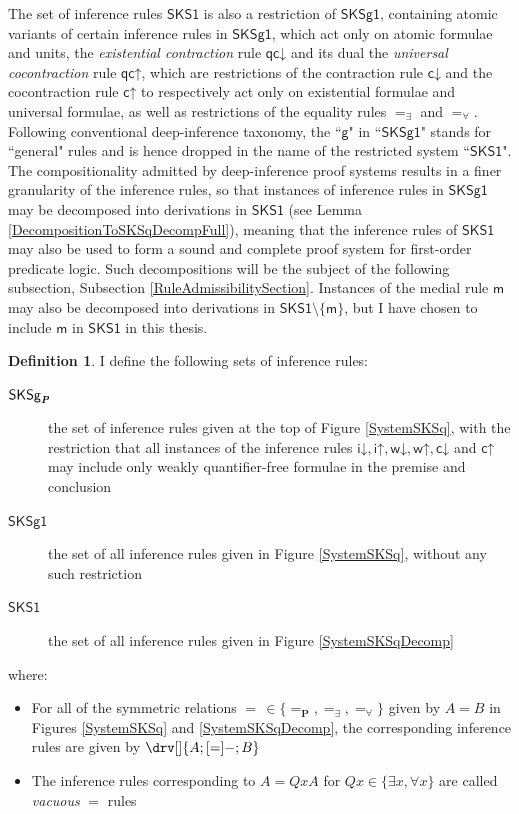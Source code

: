 \documentclass[10pt]{article}
\theoremstyle{definition}\newtheorem{remark}[theorem]{Remark}
\theoremstyle{definition}\newtheorem{example}[theorem]{Example}
\theoremstyle{definition}\newtheorem{definition}[theorem]{Definition}
\newcommand{\SKSProp}{{\mathsf{SKSg}_{\textbf{\textit{P}}}}}
\newcommand{\SKSq}{{\mathsf{SKSg1}}}
\newcommand{\SKSqDecomp}{{\mathsf{SKS1}}}
\newcommand{\iUp}{{\mathsf{i\mathord\uparrow}}}
\newcommand{\iDown}{{\mathsf{i\mathord\downarrow}}}
\newcommand{\cUp}{{\mathsf{c\mathord\uparrow}}}
\newcommand{\cDown}{{\mathsf{c\mathord\downarrow}}}
\newcommand{\wUp}{{\mathsf{w\mathord\uparrow}}}
\newcommand{\wDown}{{\mathsf{w\mathord\downarrow}}}
\newcommand{\medial}{{\mathsf{m}}}
\newcommand{\qcUp}{{\mathsf{qc\mathord\uparrow}}}
\newcommand{\qcDown}{{\mathsf{qc\mathord\downarrow}}}
\newcommand{\eqProp}{=_{\textbf{P}}}
\newcommand{\eqExists}{=_{\exists}}
\newcommand{\eqForall}{=_{\forall}}
\begin{document}
	The set of inference rules $\SKSqDecomp$ is also a restriction of $\SKSq$, containing atomic variants of certain inference rules in $\SKSq$, which act only on atomic formulae and units, the \textit{existential contraction} rule $\qcDown$ and its dual the \textit{universal cocontraction} rule $\qcUp$, which are restrictions of the contraction rule $\cDown$ and the cocontraction rule $\cUp$ to respectively act only on existential formulae and universal formulae, as well as restrictions of the equality rules $\eqExists$ and $\eqForall$. Following conventional deep-inference taxonomy, the ``$\mathsf{g}$" in ``$\SKSq$" stands for ``general" rules and is hence dropped in the name of the restricted system ``$\SKSqDecomp$". The compositionality admitted by deep-inference proof systems results in a finer granularity of the inference rules, so that instances of inference rules in $\SKSq$ may be decomposed into derivations in $\SKSqDecomp$ (see Lemma \ref{DecompositionToSKSqDecompFull}), meaning that the inference rules of $\SKSqDecomp$ may also be used to form a sound and complete proof system for first-order predicate logic. Such decompositions will be the subject of the following subsection, Subsection \ref{RuleAdmissibilitySection}. Instances of the medial rule $\medial$ may also be decomposed into derivations in $\SKSqDecomp \setminus \{\medial\}$, but I have chosen to include $\medial$ in $\SKSqDecomp$ in this thesis.
	
	\begin{definition}
		I define the following sets of inference rules:
		\begin{description}
			\item[$\SKSProp$] the set of inference rules given at the top of Figure \ref{SystemSKSq}, with the restriction that all instances of the inference rules $\iDown, \iUp, \wDown, \wUp, \cDown$ and $\cUp$ may include only weakly quantifier-free formulae in the premise and conclusion
			
			\item[$\SKSq$] the set of all inference rules given in Figure \ref{SystemSKSq}, without any such restriction
			
			\item[$\SKSqDecomp$] the set of all inference rules given in Figure \ref{SystemSKSqDecomp}
		\end{description}
		where:
		\begin{itemize}
			\item For all of the symmetric relations $= \, \in \{\eqProp, \eqExists, \eqForall\}$ given by $A = B$ in Figures \ref{SystemSKSq} and \ref{SystemSKSqDecomp}, the corresponding inference rules are given by $\drv[] {A ; [=]- ; B}$
			
			\item The inference rules corresponding to $A = Qx A$ for $Qx \in \{\exists x, \forall x\}$ are called \textit{vacuous} $=$ rules
		\end{itemize}
	\end{definition}
	
\end{document}
